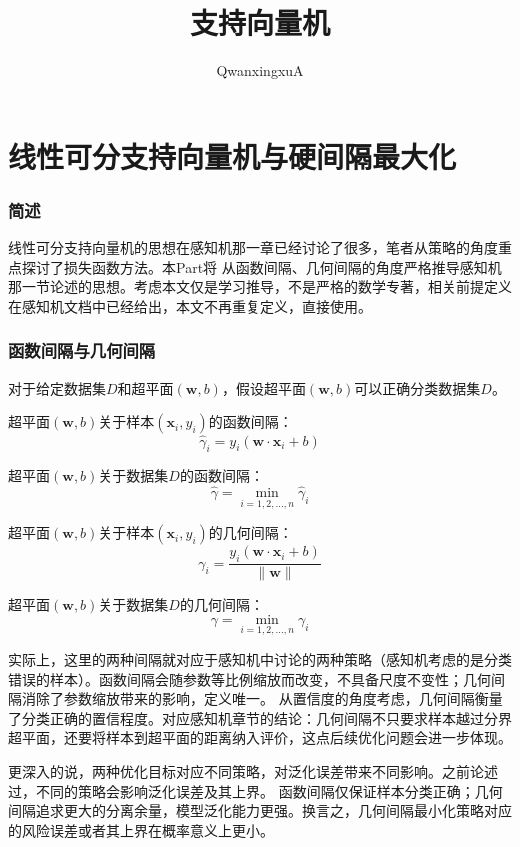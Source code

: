 \documentclass{article}
\title{支持向量机}
\author{QwanxingxuA}
\begin{document}
\maketitle
\part{线性可分支持向量机与硬间隔最大化}
    \section{简述}
        线性可分支持向量机的思想在感知机那一章已经讨论了很多，笔者从策略的角度重点探讨了损失函数方法。本Part将
        从函数间隔、几何间隔的角度严格推导感知机那一节论述的思想。考虑本文仅是学习推导，不是严格的数学专著，相关前提定义
        在感知机文档中已经给出，本文不再重复定义，直接使用。
    \section{函数间隔与几何间隔}
        对于给定数据集$D$和超平面$(\boldsymbol{w},b)$，假设超平面$(\boldsymbol{w},b)$可以正确分类数据集$D$。

        超平面$(\boldsymbol{w},b)$关于样本$(\boldsymbol{x}_i,y_i)$的函数间隔：
        \[\widehat{\gamma }_i=y_i(\boldsymbol{w}\cdot \boldsymbol{x}_i+b)\]
        
        超平面$(\boldsymbol{w},b)$关于数据集$D$的函数间隔：
        \[\widehat{\gamma} =\min_{i=1,2,\dots,n}\widehat{\gamma}_i\]

        超平面$(\boldsymbol{w},b)$关于样本$(\boldsymbol{x}_i,y_i)$的几何间隔：
        \[\gamma_i =\frac{y_i(\boldsymbol{w} \cdot \boldsymbol{x}_i+b)}{\|\boldsymbol{w}\|}\]

        超平面$(\boldsymbol{w},b)$关于数据集$D$的几何间隔：
        \[\gamma=\min_{i=1,2,\dots,n}\gamma_i\]

        实际上，这里的两种间隔就对应于感知机中讨论的两种策略（感知机考虑的是分类错误的样本）。函数间隔会随参数等比例缩放而改变，不具备尺度不变性；几何间隔消除了参数缩放带来的影响，定义唯一。
        从置信度的角度考虑，几何间隔衡量了分类正确的置信程度。对应感知机章节的结论：几何间隔不只要求样本越过分界超平面，还要将样本到超平面的距离纳入评价，这点后续优化问题会进一步体现。

        更深入的说，两种优化目标对应不同策略，对泛化误差带来不同影响。之前论述过，不同的策略会影响泛化误差及其上界。
        函数间隔仅保证样本分类正确；几何间隔追求更大的分离余量，模型泛化能力更强。换言之，几何间隔最小化策略对应的风险误差或者其上界在概率意义上更小。
\end{document}
